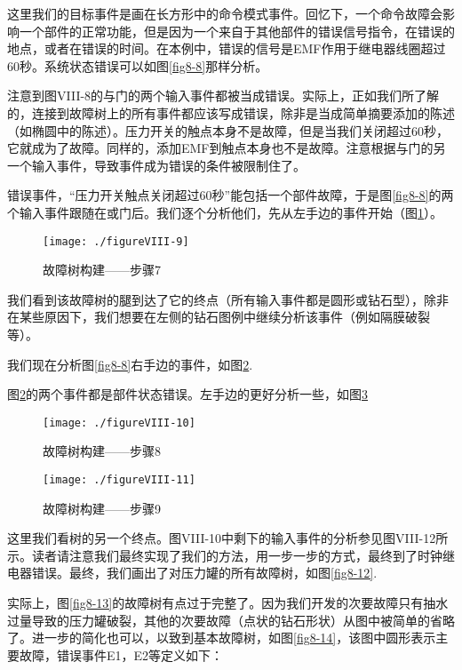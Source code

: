 \documentclass[cn,11pt,chinese]{elegantbook}
\begin{document}
{这里我们的目标事件是画在长方形中的命令模式事件。回忆下，一个命令故障会影响一个部件的正常功能，但是因为一个来自于其他部件的错误信号指令，在错误的地点，或者在错误的时间。在本例中，错误的信号是EMF作用于继电器线圈超过60秒。系统状态错误可以如图\ref{fig8-8}那样分析。

注意到图VIII-8的与门的两个输入事件都被当成错误。实际上，正如我们所了解的，连接到故障树上的所有事件都应该写成错误，除非是当成简单摘要添加的陈述（如椭圆中的陈述）。压力开关的触点本身不是故障，但是当我们关闭超过60秒，它就成为了故障。同样的，添加EMF到触点本身也不是故障。注意根据与门的另一个输入事件，导致事件成为错误的条件被限制住了。

错误事件，“压力开关触点关闭超过60秒”能包括一个部件故障，于是图\ref{fig8-8}的两个输入事件跟随在或门后。我们逐个分析他们，先从左手边的事件开始（图\ref{fig8-9}）。

\begin{figure}[H]
	\centering
	\texttt{[image: ./figureVIII-9]}
	\caption{故障树构建——步骤7}
	\label{fig8-9}
\end{figure}

我们看到该故障树的腿到达了它的终点（所有输入事件都是圆形或钻石型），除非在某些原因下，我们想要在左侧的钻石图例中继续分析该事件（例如隔膜破裂等）。

我们现在分析图\ref{fig8-8}右手边的事件，如图\ref{fig8-10}.

图\ref{fig8-10}的两个事件都是部件状态错误。左手边的更好分析一些，如图\ref{fig8-11}

\begin{figure}[H]
	\centering
	\texttt{[image: ./figureVIII-10]}
	\caption{故障树构建——步骤8}
	\label{fig8-10}
\end{figure}

\begin{figure}[H]
	\centering
	\texttt{[image: ./figureVIII-11]}
	\caption{故障树构建——步骤9}
	\label{fig8-11}
\end{figure}

这里我们看树的另一个终点。图VIII-10中剩下的输入事件的分析参见图VIII-12所示。读者请注意我们最终实现了我们的方法，用一步一步的方式，最终到了时钟继电器错误。最终，我们画出了对压力罐的所有故障树，如图\ref{fig8-12}.

实际上，图\ref{fig8-13}的故障树有点过于完整了。因为我们开发的次要故障只有抽水过量导致的压力罐破裂，其他的次要故障（点状的钻石形状）从图中被简单的省略了。进一步的简化也可以，以致到基本故障树，如图\ref{fig8-14}，该图中圆形表示主要故障，错误事件E1，E2等定义如下：

}
\end{document}
